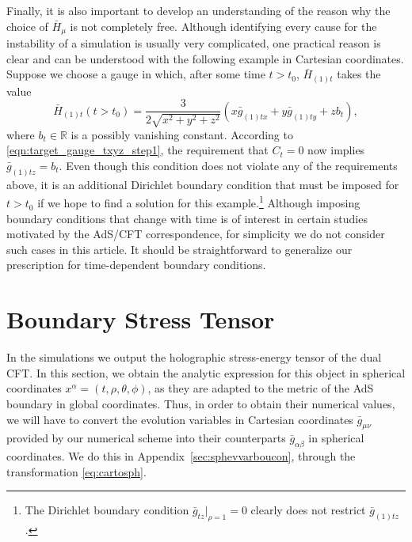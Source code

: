 \documentclass[aps,letterpaper,twocolumn,nofootinbib]{revtex4}
\numberwithin{equation}{section}
\begin{document}
Finally, it is also important to develop an understanding of the reason why the choice of $\bar{H}_\mu$ is not completely free. 
Although identifying every cause for the instability of a simulation is usually very complicated, one practical reason is clear and can be understood with the following example in Cartesian coordinates.
Suppose we choose a gauge in which, after some time $t>t_0$, $\bar{H}_{(1)t}$ takes the value
\begin{equation} 
\bar{H}_{(1)t}(t>t_0)=\frac{3}{2\sqrt{x^2+y^2+z^2}}(x \bar{g}_{(1)tx}+y\bar{g}_{(1)ty}+z b_t),
\end{equation} 
where $b_t\in \mathbb{R}$ is a possibly vanishing constant.
According to \eqref{eqn:target_gauge_txyz_step1}, the requirement that $C_t=0$ now implies $\bar{g}_{(1)tz}=b_t$. 
Even though this condition does not violate any of the requirements above, it is an additional Dirichlet boundary condition that must be imposed for $t>t_0$ if we hope to find a solution for this example.\footnote{The Dirichlet boundary condition $\bar{g}_{tz}|_{\rho=1}=0$ clearly does not restrict $\bar{g}_{(1)tz}$.} Although imposing boundary conditions that change with time is of interest in certain studies motivated by the AdS/CFT correspondence, for simplicity we do not consider such cases in this article. It should be straightforward to generalize our prescription for time-dependent boundary conditions. 



\section{Boundary Stress Tensor}
\label{sec:bouset2}

In the simulations we output the holographic stress-energy tensor of the dual CFT.
In this section, we obtain the analytic expression for this object in spherical coordinates $x^\alpha=(t,\rho,\theta,\phi)$, as they are adapted to the metric of the AdS boundary in global coordinates. Thus, in order to obtain their numerical values, we will have to convert the evolution variables in Cartesian coordinates $\bar{g}_{\mu\nu}$ provided by our numerical scheme into their counterparts $\bar{g}_{\alpha\beta}$ in spherical coordinates. We do this in Appendix~\ref{sec:sphevvarboucon}, through the transformation \eqref{eq:cartosph}.
\end{document}
